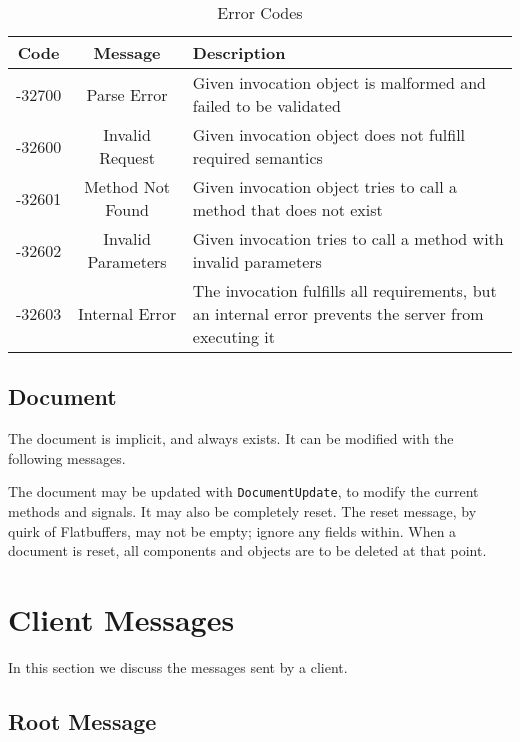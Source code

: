 \documentclass[11pt, oneside]{amsart}
\begin{document}
\begin{table}
	\begin{tabular}{ccp{3.5in}}
		\toprule
		\textbf{Code} & \textbf{Message} & \textbf{Description} \\
		\midrule
		-32700 & Parse Error & Given invocation object is malformed and failed to be validated \\
		-32600 & Invalid Request & Given invocation object does not fulfill required semantics \\
		-32601 & Method Not Found & Given invocation object tries to call a method that does not exist \\
		-32602 & Invalid Parameters & Given invocation tries to call a method with invalid parameters \\
		-32603 & Internal Error & The invocation fulfills all requirements, but an internal error prevents the server from executing it \\		
		\bottomrule
	\end{tabular}
	\caption{Error Codes}
	\label{tab:error_codes}
\end{table}

\subsection{Document}

The document is implicit, and always exists. It can be modified with the following messages.



The document may be updated with \texttt{DocumentUpdate}, to modify the current methods and signals. It may also be completely reset. The reset message, by quirk of Flatbuffers, may not be empty; ignore any fields within. When a document is reset, all components and objects are to be deleted at that point.

\section{Client Messages}

In this section we discuss the messages sent by a client.

\subsection{Root Message}
\end{document}
